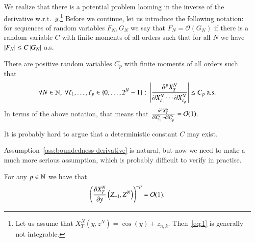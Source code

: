 \documentclass{amsart}
\begin{document}
We realize that there is a potential problem looming in the inverse of the
derivative w.r.t.~$y$.\footnote{Let us assume that
  $X^N_T(y,z^N) = \cos(y) + z_{n,k}$. Then~\eqref{eq:1} is generally not
  integrable.} Before we continue, let us introduce the following notation:
for sequences of random variables $F_N, G_N$ we say that
$F_N = \mathcal{O}(G_N)$ if there is a random variable $C$ with finite moments
of all orders such that for all $N$ we have $\left\lvert F_N\right\rvert \le C \left\lvert G_N\right\rvert$ a.s.

\begin{assumption}
  \label{ass:boundedness-derivative}
  There are positive random variables $C_p$ with finite moments of all orders
  such that
  \begin{equation*}
    \forall N \in \mathbb{N},\ \forall \ell_1, \ldots, \ell_p \in \{0, \ldots, 2^N-1\}:\ \left\lvert\frac{\partial^p
        X^N_T}{\partial X^N_{\ell_1} \cdots \partial X^N_{\ell_p}}\right\rvert \le C_p \text{ a.s.}
  \end{equation*}
  In terms of the above notation, that means that $\frac{\partial^p X^N_T}{\partial
    X^N_{\ell_1} \cdots \partial X^N_{\ell_p}} = \mathcal{O}(1)$.
\end{assumption}

\begin{remark}
  It is probably hard to argue that a deterministic constant $C$ may exist.
\end{remark}

Assumption~\ref{ass:boundedness-derivative} is natural, but now we need to
make a much more serious assumption, which is probably difficult to verify in
practise.

\begin{assumption}
  \label{ass:boundedness-inverse}
  For any $p \in \mathbb{N}$ we have that
  \begin{equation*}
    \left( \frac{\partial X^N_T}{\partial y}\left( Z_{-1}, Z^N \right) \right)^{-p} = \mathcal{O}(1).
  \end{equation*}
\end{assumption}
\end{document}

